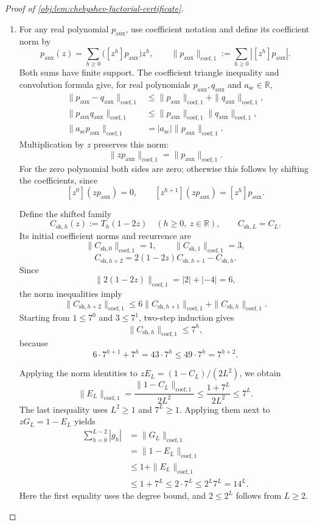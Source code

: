 \documentclass[11pt]{article}
\begin{document}
\begin{proof}[Proof of \cref{obj:lem:chebyshev-factorial-certificate}]
\begin{enumerate}
\item For any real polynomial \(p_{\mathrm{aux}}\), use coefficient notation and define its coefficient norm by
\[
p_{\mathrm{aux}}(z)
 =\sum_{h\ge0}\bigl([z^h]p_{\mathrm{aux}}\bigr)z^h,
\qquad
\|p_{\mathrm{aux}}\|_{\mathrm{coef},1}
 :=\sum_{h\ge0}|[z^h]p_{\mathrm{aux}}|.
\]
Both sums have finite support. The coefficient triangle inequality and convolution formula give, for real polynomials \(p_{\mathrm{aux}},q_{\mathrm{aux}}\) and \(a_{\mathrm{sc}}\in\mathbb R\),
\[
\begin{aligned}
\|p_{\mathrm{aux}}-q_{\mathrm{aux}}\|_{\mathrm{coef},1}
 &\le \|p_{\mathrm{aux}}\|_{\mathrm{coef},1}
      +\|q_{\mathrm{aux}}\|_{\mathrm{coef},1},\\
\|p_{\mathrm{aux}}q_{\mathrm{aux}}\|_{\mathrm{coef},1}
 &\le \|p_{\mathrm{aux}}\|_{\mathrm{coef},1}
       \|q_{\mathrm{aux}}\|_{\mathrm{coef},1},\\
\|a_{\mathrm{sc}}p_{\mathrm{aux}}\|_{\mathrm{coef},1}
 &=|a_{\mathrm{sc}}|\|p_{\mathrm{aux}}\|_{\mathrm{coef},1}.
\end{aligned}
\]
Multiplication by \(z\) preserves this norm:
\[
\|zp_{\mathrm{aux}}\|_{\mathrm{coef},1}
 =\|p_{\mathrm{aux}}\|_{\mathrm{coef},1}.
\]
For the zero polynomial both sides are zero; otherwise this follows by shifting the coefficients, since
\[
[z^0](zp_{\mathrm{aux}})=0,\qquad
[z^{h+1}](zp_{\mathrm{aux}})=[z^h]p_{\mathrm{aux}}.
\]

Define the shifted family
\[
C_{\mathrm{sh},h}(z):=T_h(1-2z)
\quad(h\ge0,\ z\in\mathbb R),
\qquad C_{\mathrm{sh},L}=C_L.
\]
Its initial coefficient norms and recurrence are
\[
\|C_{\mathrm{sh},0}\|_{\mathrm{coef},1}=1,\qquad
\|C_{\mathrm{sh},1}\|_{\mathrm{coef},1}=3,
\]
\[
C_{\mathrm{sh},h+2}
 =2(1-2z)C_{\mathrm{sh},h+1}-C_{\mathrm{sh},h}.
\]
Since
\[
\|2(1-2z)\|_{\mathrm{coef},1}=|2|+|-4|=6,
\]
the norm inequalities imply
\[
\|C_{\mathrm{sh},h+2}\|_{\mathrm{coef},1}
 \le6\|C_{\mathrm{sh},h+1}\|_{\mathrm{coef},1}
    +\|C_{\mathrm{sh},h}\|_{\mathrm{coef},1}.
\]
Starting from \(1\le7^0\) and \(3\le7^1\), two-step induction gives
\[
\|C_{\mathrm{sh},h}\|_{\mathrm{coef},1}\le7^h,
\]
because
\[
6\cdot7^{h+1}+7^h
 =43\cdot7^h
 \le49\cdot7^h
 =7^{h+2}.
\]

Applying the norm identities to \(zE_L=(1-C_L)/(2L^2)\), we obtain
\[
\|E_L\|_{\mathrm{coef},1}
 =\frac{\|1-C_L\|_{\mathrm{coef},1}}{2L^2}
 \le\frac{1+7^L}{2L^2}
 \le7^L.
\]
The last inequality uses \(L^2\ge1\) and \(7^L\ge1\). Applying them next to \(zG_L=1-E_L\) yields
\[
\begin{aligned}
\sum_{h=0}^{L-2}|g_h|
 &=\|G_L\|_{\mathrm{coef},1}\\
 &=\|1-E_L\|_{\mathrm{coef},1}\\
 &\le1+\|E_L\|_{\mathrm{coef},1}\\
 &\le1+7^L
 \le2\cdot7^L
 \le2^L7^L
 =14^L.
\end{aligned}
\]
Here the first equality uses the degree bound, and \(2\le2^L\) follows from \(L\ge2\).


\end{enumerate}
\end{proof}
\end{document}
